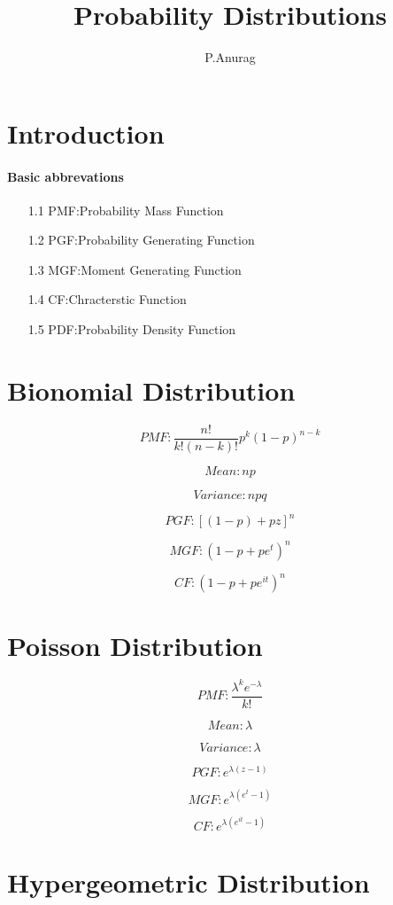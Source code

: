 \documentclass[a4paper,10pt]{book}
\title{Probability Distributions}
\author{P.Anurag}
\begin{document}
\maketitle
\tableofcontents


\section{Introduction}
\paragraph{Basic abbrevations}


\begin{enumerate}
 \item[1.1] PMF:Probability Mass Function
 \item[1.2] PGF:Probability Generating Function
 \item[1.3] MGF:Moment Generating Function
 \item[1.4] CF:Chracterstic Function
 \item[1.5] PDF:Probability Density Function 
\end{enumerate}

\section{Bionomial Distribution}

\[
 PMF :  \frac{n!}{k!(n-k)!} p^k (1-p)^{n-k}
\]

\[
Mean: np
\]

\[
 Variance: npq
\]

\[ 
 PGF :  {\left[
                   (1-p)+pz
             \right]}^n     
\]

\[
 MGF : {(1-p+pe^t)}^n
\]

\[
 CF : {(1-p+pe^{it})}^n 
\]

\section{Poisson Distribution}

\[
 PMF : \frac{\lambda^k e^{-\lambda}}{k!}
\]

\[
 Mean : \lambda
\]

\[
 Variance : \lambda
\]

\[
 PGF : e^{\lambda(z-1)}
\]

\[
 MGF : e^{\lambda(e^t-1)}
\]

\[
 CF : e^{\lambda(e^{it}-1)}
\]

\section{Hypergeometric Distribution}
\end{document}
